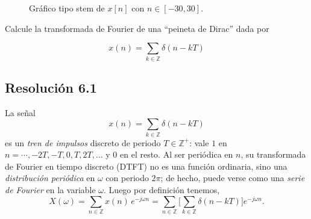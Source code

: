 \documentclass[
  11pt,
  letterpaper,
   addpoints,
   answers
  ]{exam}
\begin{document}
\begin{questions}
\begin{solution}
\begin{figure}[H]
\caption{Gráfico tipo stem de $x[n]$ con $n\in[-30,30]$.}
\label{fig:xn_piecewise_stem}
\end{figure}

\end{solution}

\question Calcule la transformada de Fourier de una ``peineta de Dirac'' dada por

\begin{equation*}
  x(n) = \sum_{k \in \mathbb{Z}} \delta(n - kT)
\end{equation*}

\begin{solution}
\subsection*{Resolución 6.1}

La señal
\[
x(n)=\sum_{k\in\mathbb{Z}}\delta(n-kT)
\]
es un \emph{tren de impulsos} discreto de periodo $T\in\mathbb{Z}^+$: vale $1$ en $n=\cdots,-2T,-T,0,T,2T,\dots$ y $0$ en el resto. Al ser periódica en $n$, su transformada de Fourier en tiempo discreto (DTFT) no es una función ordinaria, sino una \emph{distribución periódica} en $\omega$ con periodo $2\pi$; de hecho, puede verse como una \emph{serie de Fourier} en la variable $\omega$. Luego por definición tenemos,
\[
X(\omega)=\sum_{n\in\mathbb{Z}} x(n)\,e^{-j\omega n}
=\sum_{n\in\mathbb{Z}}\Bigg[\sum_{k\in\mathbb{Z}}\delta(n-kT)\Bigg]e^{-j\omega n}.
\]


\end{solution}
\end{questions}
\end{document}
